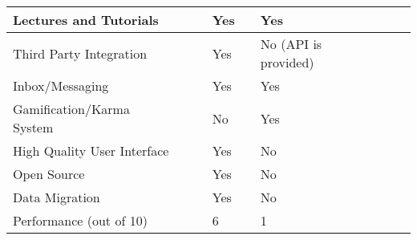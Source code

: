 \begin{table}[ht]
{\begin{tabular}{llllllll}
        \multicolumn{1}{|l|}{Lectures and Tutorials}      & \multicolumn{1}{l|}{} & \multicolumn{1}{l|}{} & \multicolumn{1}{l|}{Yes} & \multicolumn{1}{l|}{} & \multicolumn{1}{l|}{Yes}                       & \multicolumn{1}{l|}{} & \multicolumn{1}{l|}{} \\ \hline
        \multicolumn{1}{|l|}{Third Party Integration}     & \multicolumn{1}{l|}{} & \multicolumn{1}{l|}{} & \multicolumn{1}{l|}{Yes} & \multicolumn{1}{l|}{} & \multicolumn{1}{l|}{No (API is provided)}      & \multicolumn{1}{l|}{} & \multicolumn{1}{l|}{} \\ \hline
        \multicolumn{1}{|l|}{Inbox/Messaging}             & \multicolumn{1}{l|}{} & \multicolumn{1}{l|}{} & \multicolumn{1}{l|}{Yes} & \multicolumn{1}{l|}{} & \multicolumn{1}{l|}{Yes}                       & \multicolumn{1}{l|}{} & \multicolumn{1}{l|}{} \\ \hline
        \multicolumn{1}{|l|}{Gamification/Karma System}   & \multicolumn{1}{l|}{} & \multicolumn{1}{l|}{} & \multicolumn{1}{l|}{No} & \multicolumn{1}{l|}{} & \multicolumn{1}{l|}{Yes}                       & \multicolumn{1}{l|}{} & \multicolumn{1}{l|}{} \\ \hline
        \multicolumn{1}{|l|}{High Quality User Interface} & \multicolumn{1}{l|}{} & \multicolumn{1}{l|}{} & \multicolumn{1}{l|}{Yes} & \multicolumn{1}{l|}{} & \multicolumn{1}{l|}{No}                        & \multicolumn{1}{l|}{} & \multicolumn{1}{l|}{} \\ \hline
        \multicolumn{1}{|l|}{Open Source}                 & \multicolumn{1}{l|}{} & \multicolumn{1}{l|}{} & \multicolumn{1}{l|}{Yes} & \multicolumn{1}{l|}{} & \multicolumn{1}{l|}{No}                        & \multicolumn{1}{l|}{} & \multicolumn{1}{l|}{} \\ \hline
        \multicolumn{1}{|l|}{Data Migration}              & \multicolumn{1}{l|}{} & \multicolumn{1}{l|}{} & \multicolumn{1}{l|}{Yes} & \multicolumn{1}{l|}{} & \multicolumn{1}{l|}{No}                        & \multicolumn{1}{l|}{} & \multicolumn{1}{l|}{} \\ \hline
        Performance (out of 10)                           &                       &                       & 6                      &                       & 1                                              &                       &                       \\ \hline
    \end{tabular}}
\end{table}

